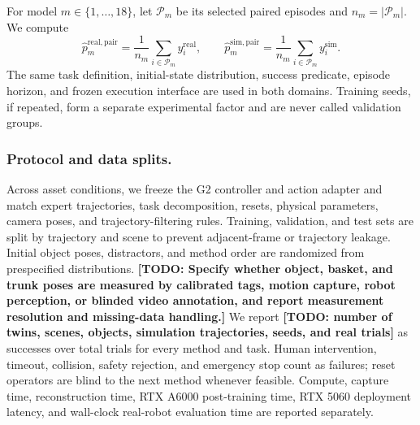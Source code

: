 \documentclass[letterpaper,10pt,conference]{ieeeconf}
\newcommand{\todo}[1]{\textbf{[TODO: #1]}}
\begin{document}
For model $m\in\{1,\ldots,18\}$, let $\mathcal{P}_m$ be its selected paired
episodes and $n_m=|\mathcal{P}_m|$. We compute
\begin{equation}
  \widehat{p}^{\mathrm{real,pair}}_m
    =\frac{1}{n_m}\sum_{i\in\mathcal{P}_m}y_i^{\mathrm{real}},
  \qquad
  \widehat{p}^{\mathrm{sim,pair}}_m
    =\frac{1}{n_m}\sum_{i\in\mathcal{P}_m}y_i^{\mathrm{sim}}.
  \label{eq:sim-real-rates}
\end{equation}
The same task definition, initial-state distribution, success predicate, episode
horizon, and frozen execution interface are used in both domains. Training seeds,
if repeated, form a separate experimental factor and are never called validation
groups.

\subsubsection{Protocol and data splits.}
Across asset conditions, we freeze the G2 controller and action adapter and
match expert trajectories, task decomposition, resets, physical parameters,
camera poses, and trajectory-filtering rules. Training, validation, and test
sets are split by trajectory and scene to prevent adjacent-frame or trajectory
leakage. Initial object poses, distractors, and method order are randomized from
prespecified distributions. \todo{Specify whether object, basket, and trunk
poses are measured by calibrated tags, motion capture, robot perception, or
blinded video annotation, and report measurement resolution and missing-data
handling.} We report \todo{number of twins, scenes, objects,
simulation trajectories, seeds, and real trials} as successes over total trials
for every method and task. Human intervention, timeout, collision, safety
rejection, and emergency stop count as failures; reset operators are blind to
the next method whenever feasible. Compute, capture time, reconstruction time,
RTX A6000 post-training time, RTX 5060 deployment latency, and wall-clock
real-robot evaluation time are reported separately.
\end{document}
